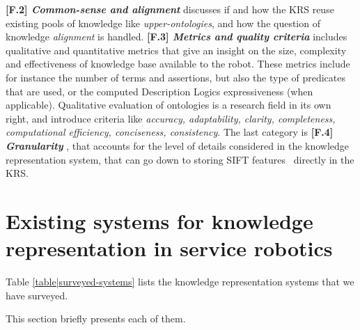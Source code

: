 \documentclass{IEEEtran}
\newcommand{\taxon}[2]{%
    \textbf{[#1] \emph{#2}}
}
\begin{document}
\taxon{F.2}{Common-sense and alignment} discusses if and how the KRS reuse
existing pools of knowledge like \emph{upper-ontologies}, and how the question
of knowledge \emph{alignment} is handled. \taxon{F.3}{Metrics and quality
criteria} includes qualitative and quantitative metrics that give an insight on
the size, complexity and effectiveness of knowledge base available to the robot.
These metrics include for instance the number of terms and assertions, but also
the type of predicates that are used, or the computed Description Logics
expressiveness (when applicable).  Qualitative evaluation of ontologies is a
research field in its own right, and introduce criteria like \emph{accuracy,
adaptability, clarity, completeness, computational efficiency, conciseness,
consistency}. The last category is \taxon{F.4}{Granularity}, that accounts for
the level of details considered in the knowledge representation system, that can
go down to storing SIFT features~\cite{Suh2007} directly in the KRS.

\section{Existing systems for knowledge representation in service robotics}
\label{sect|surveyed-systems}

Table \ref{table|surveyed-systems} lists the knowledge representation
systems that we have surveyed.

This section briefly presents each of them.
\end{document}
